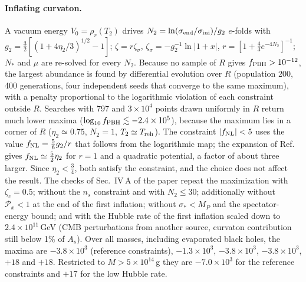 \documentclass[aps,prd,onecolumn,superscriptaddress,nofootinbib,floatfix]{revtex4-2}
\newcommand{\fpbh}{f_{\rm PBH}}
\newcommand{\Treh}{T_{\rm reh}}
\newcommand{\Ns}{N_\ast}
\begin{document}
\paragraph*{Inflating curvaton.}
A vacuum energy $V_0=\rho_r(T_2)$ drives $N_2=\ln(\sigma_{\rm end}/\sigma_{\rm ini})/g_2$ $e$-folds with $g_2=\frac32[(1+4\eta_2/3)^{1/2}-1]$; $\zeta=r\zeta_\sigma$, $\zeta_\sigma=-g_2^{-1}\ln|1+x|$, $r=[1+\frac43e^{-4N_2}]^{-1}$; $\Ns$ and $\mu$ are re-solved for every $N_2$. Because no sample of $R$ gives $\fpbh>10^{-12}$, the largest abundance is found by differential evolution over $R$ (population 200, 400 generations, four independent seeds that converge to the same maximum), with a penalty proportional to the logarithmic violation of each constraint outside $R$. Searches with 797 and $3\times10^4$ points drawn uniformly in $R$ return much lower maxima ($\log_{10}\fpbh\lesssim-2.4\times10^{5}$), because the maximum lies in a corner of $R$ ($\eta_2\simeq0.75$, $N_2=1$, $T_2\simeq\Treh$). The constraint $|f_{\rm NL}|<5$ uses the value $f_{\rm NL}=\frac56g_2/r$ that follows from the logarithmic map; the expansion of Ref.~\cite{Enomoto:2012uy} gives $f_{\rm NL}\simeq\frac52\eta_2$ for $r=1$ and a quadratic potential, a factor of about three larger. Since $\eta_2<\frac34$, both satisfy the constraint, and the choice does not affect the result. The checks of Sec.~IV\,A of the paper repeat the maximization with $\zeta_c=0.5$; without the $n_s$ constraint and with $N_2\le30$; additionally without $\mathcal{P}_x<1$ at the end of the first inflation; without $\sigma_\ast<M_P$ and the spectator-energy bound; and with the Hubble rate of the first inflation scaled down to $2.4\times10^{11}$\,GeV (CMB perturbations from another source, curvaton contribution still below 1\% of $A_s$). Over all masses, including evaporated black holes, the maxima are $-3.8\times10^{3}$ (reference constraints), $-1.3\times10^{3}$, $-3.8\times10^{3}$, $-3.8\times10^{3}$, $+18$ and $+18$. Restricted to $M>5\times10^{14}$\,g they are $-7.0\times10^{3}$ for the reference constraints and $+17$ for the low Hubble rate.
\end{document}
